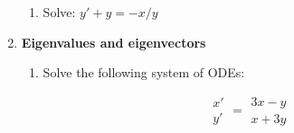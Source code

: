 \documentclass[letterpaper, fontsize=12pt]{scrartcl} %
\numberwithin{equation}{section} %
\numberwithin{figure}{section} %
\numberwithin{table}{section} %
\begin{document}
\begin{enumerate}
\begin{enumerate}[label = (\alph*)]
\item Solve: $y' + y = -x/y$



\end{enumerate}

\item \textbf{Eigenvalues and eigenvectors}
\begin{enumerate}[label = (\alph*)]
\item Solve the following system of ODEs: 

\[ \begin{matrix} x' \\ y' \end{matrix} = \begin{matrix} 3x -y \\x + 3y \end{matrix} \]


\end{enumerate}
\end{enumerate}
\end{document}
